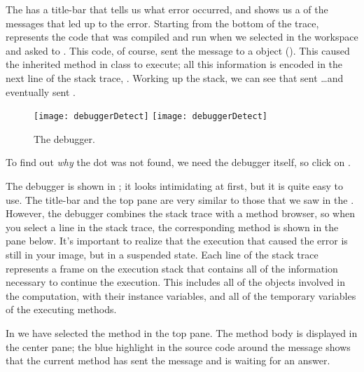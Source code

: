 \documentclass[a4paper,10pt,twoside]{book}
\begin{document}
The  has a title-bar that tells us what error occurred, and shows us a  of the messages that led up to the error.
Starting from the bottom of the trace,  represents the code that was compiled and run when we selected  in the workspace and asked \sq to .
This code, of course, sent the message  to a  object ().
This caused the inherited  method in class  to execute; all this information is encoded in the next line of the stack trace, .
Working up the stack, we can see that  sent \ldots and eventually  sent .

\begin{figure}[btp]
	\begin{center}
	\ifluluelse
		{\texttt{[image: debuggerDetect]}}
		{\texttt{[image: debuggerDetect]}}
	\end{center}
	\caption{The debugger.}
	\label{fig:debuggerDetect}
\end{figure}

To find out \emph{why} the dot was not found, we need the debugger itself, so click on .


The debugger is shown in ; it looks intimidating at first, but it is quite easy to use.
The title-bar and the top pane are very similar to those that we saw in the .
However, the debugger combines the stack trace with a method browser, so when you select a line in the stack trace, the corresponding method is shown in the pane below.
It's important to realize that the execution that caused the error is still in your image, but in a suspended state.
Each line of the stack trace represents a frame on the execution stack that contains all of the information necessary to continue the execution.
This includes all of the objects involved in the computation, with their instance variables, and all of the temporary variables of the executing methods.

In  we have selected the  method in the top pane.
The method body is displayed in the center pane; the blue highlight in the source code around the message  shows that the current method has sent the message  and is waiting for an answer.
\end{document}
